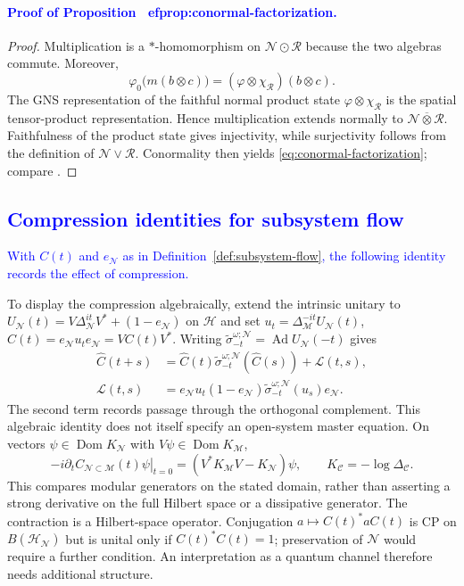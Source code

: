 \documentclass[a4paper,11pt]{article}
\theoremstyle{definition}
\newcommand{\mR}{\mathcal{R}}
\newcommand{\nn}{\nonumber}
\newcommand{\mN}{\mathcal{N}}
\newcommand{\mH}{\mathcal{H}}
\newcommand{\mM}{\mathcal{M}}
\newcommand{\NL}[1]{\textcolor{blue}{#1}}
\begin{document}
\NL{\paragraph{Proof of Proposition~
ef{prop:conormal-factorization}.}}
\begin{proof}
Multiplication is a $*$-homomorphism on $\mN\odot\mR$ because
the two algebras commute.  Moreover,
\begin{equation}
 \varphi_0\bigl(m(b\otimes c)\bigr)
 =(\varphi\otimes\chi_{\mR})(b\otimes c).
\end{equation}
The GNS representation of the faithful normal product state
$\varphi\otimes\chi_{\mR}$ is the spatial tensor-product representation.  Hence
multiplication extends normally to $\mN\overline\otimes\mR$.
Faithfulness of the product state gives injectivity, while surjectivity follows
from the definition of $\mN\vee\mR$.  Conormality then yields
\eqref{eq:conormal-factorization}; compare
\cite{Faulkner2020,FaulknerSperanza2024}.
\end{proof}

\subsection{\NL{Compression identities for subsystem flow}}
\label{app:compressed-flow}

\NL{With $C(t)$ and $e_{\mN}$ as in Definition~\ref{def:subsystem-flow}, the following identity records the effect of compression.}

To display the compression algebraically, extend the intrinsic unitary to
$U_{\mN}(t)=V\Delta_{\mN}^{it}V^*+(1-e_{\mN})$ on $\mathcal H$ and set
$u_t=\Delta_{\mM}^{-it}U_{\mN}(t)$, $\widehat C(t)=e_{\mN}u_te_{\mN}=VC(t)V^*$.
Writing $\widetilde\sigma^{\omega;\mN}_{-t}=\operatorname{Ad}U_{\mN}(-t)$ gives
\begin{align}
 \widehat C(t+s)&=\widehat C(t)\widetilde\sigma^{\omega;\mN}_{-t}(\widehat C(s))
                  +\mathcal L(t,s),\nn\\
 \mathcal L(t,s)&=e_{\mN}u_t(1-e_{\mN})\widetilde\sigma^{\omega;\mN}_{-t}(u_s)e_{\mN}.
\end{align}
The second term records passage through the orthogonal complement. This algebraic
identity does not itself specify an open-system master equation.
On vectors $\psi\in\operatorname{Dom}K_{\mN}$ with $V\psi\in\operatorname{Dom}K_{\mM}$,
\begin{equation}
 -i\left.\partial_t C_{\mN\subset\mM}(t)\psi\right|_{t=0}
 =(V^*K_{\mM}V-K_{\mN})\psi,\qquad K_{\mathcal C}=-\log\Delta_{\mathcal C}.
\end{equation}
This compares modular generators on the stated domain, rather than asserting
a strong derivative on the full Hilbert space or a dissipative generator.
The contraction is a Hilbert-space operator. Conjugation
$a\mapsto C(t)^*aC(t)$ is CP on $B(\mH_{\mN})$ but is unital only if
$C(t)^*C(t)=1$; preservation of $\mN$ would require a further condition.
An interpretation as a quantum channel therefore needs additional structure.
\end{document}
